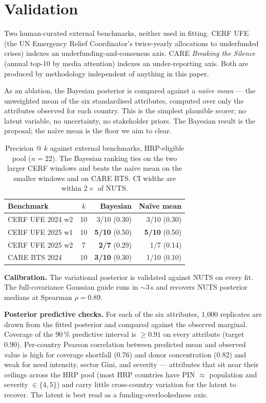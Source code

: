 \documentclass[11pt,a4paper]{article}
\begin{document}
\section{Validation}\label{sec:val}

Two human-curated external benchmarks, neither used in fitting. CERF UFE
(the UN Emergency Relief Coordinator's twice-yearly allocations to underfunded
crises) indexes an underfunding-and-consensus axis. CARE \emph{Breaking the
Silence} (annual top-10 by media attention) indexes an under-reporting axis.
Both are produced by methodology independent of anything in this paper.

As an ablation, the Bayesian posterior is compared against a \emph{naïve
mean} --- the unweighted mean of the six standardised attributes, computed
over only the attributes observed for each country. This is the simplest
plausible scorer; no latent variable, no uncertainty, no stakeholder priors.
The Bayesian result is the proposal; the naïve mean is the floor we aim to
clear.

\begin{table}[H]
\centering
\small
\begin{tabular}{@{}lcrr@{}}
\toprule
\textbf{Benchmark} & \textbf{$k$} & \textbf{Bayesian} & \textbf{Naïve mean} \\
\midrule
CERF UFE 2024 w2  & 10 & 3/10 (0.30) & 3/10 (0.30) \\
CERF UFE 2025 w1  & 10 & \textbf{5/10} (0.50) & \textbf{5/10} (0.50) \\
CERF UFE 2025 w2  & 7  & \textbf{2/7} (0.29)  & 1/7 (0.14) \\
CARE BTS 2024     & 10 & \textbf{3/10} (0.30) & 1/10 (0.10) \\
\bottomrule
\end{tabular}
\caption{Precision @ $k$ against external benchmarks, HRP-eligible pool
($n=22$). The Bayesian ranking ties on the two larger CERF windows and
beats the naïve mean on the smaller windows and on CARE BTS. CI widths
are within $2\times$ of NUTS.\label{tab:validation}}
\end{table}

\textbf{Calibration.} The variational posterior is validated against NUTS
on every fit. The full-covariance Gaussian guide runs in ${\sim}3$\,s and
recovers NUTS posterior medians at Spearman $\rho = 0.89$.

\textbf{Posterior predictive checks.} For each of the six attributes, 1{,}000
replicates are drawn from the fitted posterior and compared against the
observed marginal. Coverage of the 90\,\% predictive interval is
$\geq 0.91$ on every attribute (target 0.90). Per-country Pearson correlation
between predicted mean and observed value is high for coverage shortfall
(0.76) and donor concentration (0.82) and weak for need intensity, sector
Gini, and severity --- attributes that sit near their ceilings across the
HRP pool (most HRP countries have PIN $\approx$ population and severity
$\in \{4, 5\}$) and carry little cross-country variation for the latent to
recover. The latent is best read as a funding-overlookedness axis.
\end{document}
